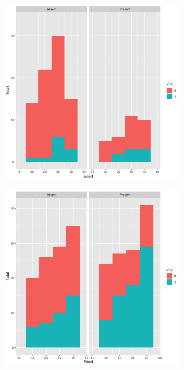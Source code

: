 \documentclass[a4paper, 9pt]{article}
\begin{document}
\begin{figure}
    \centering
    \begin{subfigure}
        \centering
        \includegraphics[scale=0.15]{images/question-1/histogram_less40.png}
        \label{image:question1-histogram_less40}
    \end{subfigure}
    \begin{subfigure}
        \centering
        \includegraphics[scale=0.15]{images/question-1/histogram_more40.png}
        \label{image:question1-histogram_more40}
    \end{subfigure}
\end{figure}
\end{document}
